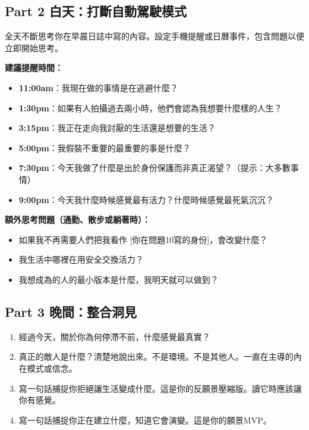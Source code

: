 \documentclass[12pt,a4paper]{article}
\begin{document}
\subsection{Part 2 白天：打斷自動駕駛模式}

全天不斷思考你在早晨日誌中寫的內容。設定手機提醒或日曆事件，包含問題以便立即開始思考。

\textbf{建議提醒時間：}
\begin{itemize}
    \item \textbf{11:00am}：我現在做的事情是在逃避什麼？
    \item \textbf{1:30pm}：如果有人拍攝過去兩小時，他們會認為我想要什麼樣的人生？
    \item \textbf{3:15pm}：我正在走向我討厭的生活還是想要的生活？
    \item \textbf{5:00pm}：我假裝不重要的最重要的事是什麼？
    \item \textbf{7:30pm}：今天我做了什麼是出於身份保護而非真正渴望？（提示：大多數事情）
    \item \textbf{9:00pm}：今天我什麼時候感覺最有活力？什麼時候感覺最死氣沉沉？
\end{itemize}

\textbf{額外思考問題（通勤、散步或躺著時）：}
\begin{itemize}
    \item 如果我不再需要人們把我看作 [你在問題10寫的身份]，會改變什麼？
    \item 我生活中哪裡在用安全交換活力？
    \item 我想成為的人的最小版本是什麼，我明天就可以做到？
\end{itemize}

\subsection{Part 3 晚間：整合洞見}

\begin{enumerate}
    \item 經過今天，關於你為何停滯不前，什麼感覺最真實？
    \item 真正的敵人是什麼？清楚地說出來。不是環境。不是其他人。一直在主導的內在模式或信念。
    \item 寫一句話捕捉你拒絕讓生活變成什麼。這是你的反願景壓縮版。讀它時應該讓你有感覺。
    \item 寫一句話捕捉你正在建立什麼，知道它會演變。這是你的願景MVP。
\end{enumerate}
\end{document}
